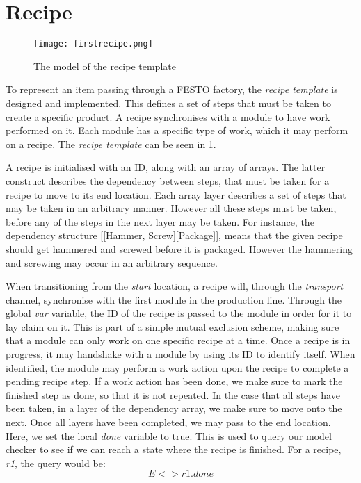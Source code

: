 \section{Recipe}
\label{subs:recipe}

\begin{figure}[h]
\centering
\texttt{[image: firstrecipe.png]}
\caption{The model of the recipe template}
\label{fig:firstrecipe}
\end{figure}

To represent an item passing through a FESTO factory, the \emph{recipe template} is designed and implemented. This defines a set of steps that must be taken to create a specific product. A recipe synchronises with a module to have work performed on it. Each module has a specific type of work, which it may perform on a recipe. The \emph{recipe template} can be seen in \cref{fig:firstrecipe}.


A recipe is initialised with an ID, along with an array of arrays. The latter construct describes the dependency between steps, that must be taken for a recipe to move to its end location. Each array layer describes a set of steps that may be taken in an arbitrary manner. However all these steps must be taken, before any of the steps in the next layer may be taken. For instance, the dependency structure [[Hammer, Screw][Package]], means that the given recipe should get hammered and screwed before it is packaged. However the hammering and screwing may occur in an arbitrary sequence.


When transitioning from the \emph{start} location, a recipe will, through the \emph{transport} channel, synchronise with the first module in the production line. Through the global \emph{var} variable, the ID of the recipe is passed to the module in order for it to lay claim on it. This is part of a simple mutual exclusion scheme, making sure that a module can only work on one specific recipe at a time. Once a recipe is in progress, it may handshake with a module by using its ID to identify itself. When identified, the module may perform a work action upon the recipe to complete a pending recipe step. If a work action has been done, we make sure to mark the finished step as done, so that it is not repeated. In the case that all steps have been taken, in a layer of the dependency array, we make sure to move onto the next. Once all layers have been completed, we may pass to the end location. Here, we set the local \emph{done} variable to true. This is used to query our model checker to see if we can reach a state where the recipe is finished. For a recipe, \emph{r1}, the query would be: \[E<> r1.done\]

